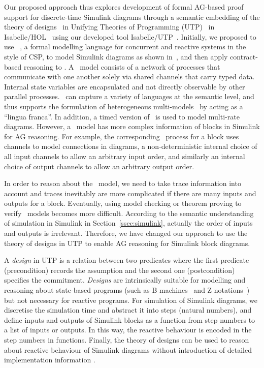 Our proposed approach thus explores development of formal AG-based proof support for discrete-time Simulink diagrams through a semantic embedding of the theory of designs~\cite{Woodcock2004} in Unifying Theories of Programming (UTP)~\cite{Hoare1998} in Isabelle/HOL~\cite{Nipkow2002} using our developed tool Isabelle/UTP~\cite{Foster2014}. Initially, we proposed to use \Circus~\cite{Oliveira2009}, a formal modelling language for concurrent and reactive systems in the style of CSP, to model Simulink diagrams as shown in~\cite{Cavalcanti2005a}, and then apply contract-based reasoning to \Circus. A \Circus\ model consists of a network of processes that communicate with one another solely via shared channels that carry typed data. Internal state variables are encapsulated and not directly observable by other parallel processes. \Circus\ can capture a variety of languages at the semantic level, and thus supports the formulation of heterogeneous multi-models~\cite{Zeyda2018} by acting as a ``lingua franca''. In addition, a timed version of \Circus\ is used to model multi-rate diagrams. However, a \Circus\ model has more complex information of blocks in Simulink for AG reasoning. For example, the corresponding \Circus\ process for a block uses channels to model connections in diagrams, a non-deterministic internal choice of all input channels to allow an arbitrary input order, and similarly an internal choice of output channels to allow an arbitrary output order. 

In order to reason about the \Circus\ model, we need to take trace information into account and traces inevitably are more complicated if there are many inputs and outputs for a block. Eventually, using model checking or theorem proving to verify \Circus\ models becomes more difficult. According to the semantic understanding of simulation in Simulink in Section~\ref{ssec:simulink}, actually the order of inputs and outputs is irrelevant. Therefore, we have changed our approach to use the theory of designs in UTP to enable AG reasoning for Simulink block diagrams. 

A \emph{design} in UTP is a relation between two predicates where the first predicate (precondition) records the assumption and the second one (postcondition) specifies the commitment. \emph{Designs} are intrinsically suitable for modelling and reasoning about state-based programs (such as B machines~\cite{Abrial2005} and Z notations~\cite{Spivey1989}) but not necessary for reactive programs. For simulation of Simulink diagrams, we discretise the simulation time and abstract it into steps (natural numbers), and define inputs and outputs of Simulink blocks as a function from step numbers to a list of inputs or outputs. In this way, the reactive behaviour is encoded in the step numbers in functions. Finally, the theory of designs can be used to reason about reactive behaviour of Simulink diagrams without introduction of detailed implementation information .

